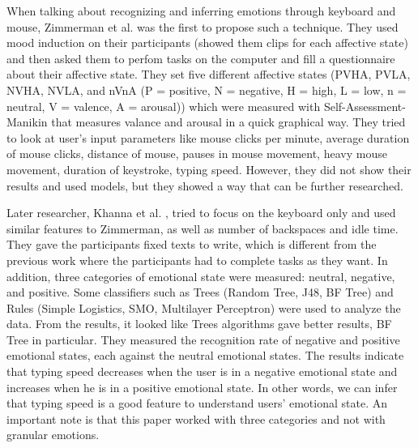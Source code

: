 \documentclass[../main.tex]{subfiles}
\begin{document}
When talking about recognizing and inferring 
emotions through keyboard and mouse, Zimmerman et al.\cite{Zimmermann} was the first 
to propose such a technique. They used mood induction on their participants 
(showed them clips for each affective state) and then asked them to perfom tasks on 
the computer and fill a questionnaire about their affective state. They set five 
different affective states (PVHA, PVLA, NVHA, NVLA, and nVnA (P = positive, N = negative, 
H = high, L = low, n = neutral, V = valence, A = arousal)) which were measured with 
Self-Assessment-Manikin that measures valance and arousal in a quick graphical way. 
They tried to look at user’s input parameters like mouse clicks per minute, average 
duration of mouse clicks, distance of mouse, pauses in mouse movement, heavy mouse movement, 
duration of keystroke, typing speed. However, they did not show their results and used models, 
but they showed a way that can be further researched.
\par

Later researcher, Khanna et al. \cite{Khanna}, tried to focus on the keyboard only and used 
similar features to Zimmerman, as well as number of backspaces and idle time. 
They gave the participants fixed texts to write, which is different from the previous work 
where the participants had to complete tasks as they want. In addition, three categories of 
emotional state were measured: neutral, negative, and positive. Some classifiers such as Trees 
(Random Tree, J48, BF Tree) and Rules (Simple Logistics, SMO, Multilayer Perceptron) were used to 
analyze the data. From the results, it looked like Trees algorithms gave better results, BF Tree in 
particular. They measured the recognition rate of negative and positive emotional states, 
each against the neutral emotional states. The results indicate that typing speed decreases when 
the user is in a negative emotional state and increases when he is in a positive emotional state. 
In other words, we can infer that typing speed is a good feature to understand users' emotional state. 
An important note is that this paper worked with three categories and not with granular emotions.
\par
\end{document}
